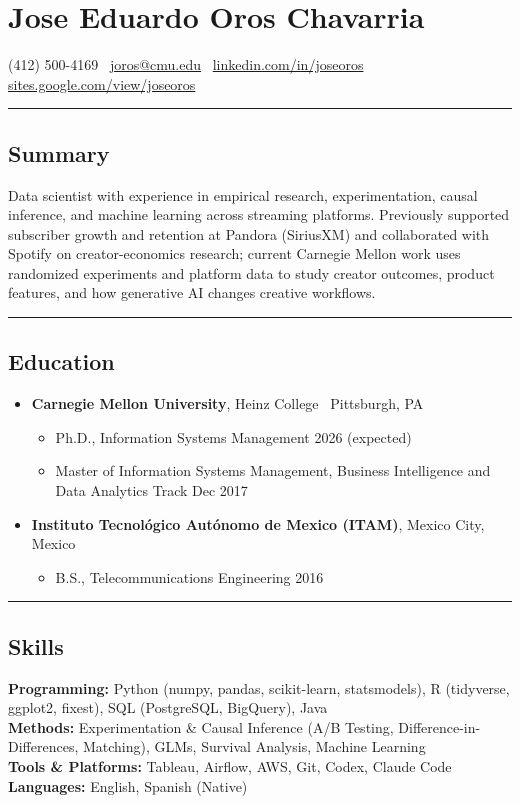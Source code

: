 \documentclass[10pt,letterpaper]{article}
\newcommand{\name}[1]{\section*{#1}}
\newcommand{\sep}{{\color{gray}\,\textbullet\,\,}}
\newcommand{\hsep}{\noindent\textcolor{gray}{\rule{\textwidth}{0.5pt}}}
\newcommand{\block}[1]{\begin{samepage}\hsep\subsection*{#1}\end{samepage}}
\begin{document}
\name{Jose Eduardo Oros Chavarria}

\begin{center}
(412) 500-4169 \sep \href{mailto:joros@cmu.edu}{joros@cmu.edu} \sep \href{https://www.linkedin.com/in/joseoros}{linkedin.com/in/joseoros} \sep \href{https://sites.google.com/view/joseoros}{sites.google.com/view/joseoros}
\end{center}

\block{Summary}

\noindent Data scientist with experience in empirical research, experimentation, causal inference, and machine learning across streaming platforms. Previously supported subscriber growth and retention at Pandora (SiriusXM) and collaborated with Spotify on creator-economics research; current Carnegie Mellon work uses randomized experiments and platform data to study creator outcomes, product features, and how generative AI changes creative workflows.

\block{Education}

\begin{itemize}[leftmargin=0pt, label={}, itemsep=4pt]
\item \textbf{Carnegie Mellon University}, Heinz College \sep Pittsburgh, PA
  \begin{itemize}[label={}]
  \item Ph.D., Information Systems Management \hfill 2026 (expected)
  \item Master of Information Systems Management, Business Intelligence and Data Analytics Track \hfill Dec 2017
  \end{itemize}
\item \textbf{Instituto Tecnol\'ogico Aut\'onomo de Mexico (ITAM)}, Mexico City, Mexico
  \begin{itemize}[label={}]
  \item B.S., Telecommunications Engineering \hfill 2016
  \end{itemize}
\end{itemize}

\block{Skills}

\noindent\textbf{Programming:} Python (numpy, pandas, scikit-learn, statsmodels), R (tidyverse, ggplot2, fixest), SQL (PostgreSQL, BigQuery), Java \\
\textbf{Methods:} Experimentation \& Causal Inference (A/B Testing, Difference-in-Differences, Matching), GLMs, Survival Analysis, Machine Learning \\
\textbf{Tools \& Platforms:} Tableau, Airflow, AWS, Git, Codex, Claude Code \\
\textbf{Languages:} English, Spanish (Native)
\end{document}
